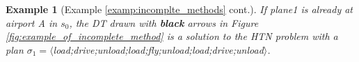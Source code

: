 \documentclass[letterpaper]{article} %
\newtheorem{examp}{Example}
\newcommand{\HtnDomain}{\mathfrak{D}}
\renewcommand{\P}{\mathcal{P}}
\newcommand{\Constraint}{\prec}
\newcommand{\tn}{\mathsf{tn}}
\newcommand{\plan}{\sigma}
\begin{document}

\begin{examp}[Example \ref{examp:incomplte_methods} cont.]\label{examp:solution}
If \textsf{plane1} is already at airport A in $s_0$, the DT drawn with \textbf{black} arrows in Figure \ref{fig:example_of_incomplete_method} is %
a solution to the HTN problem with a plan
$\plan_1=\langle${\small\textsf{load};\textsf{drive};\textsf{unload};\textsf{load};\textsf{fly};\textsf{unload};\textsf{load};\textsf{drive};\textsf{unload}}$\rangle$.
\end{examp}
\end{document}
